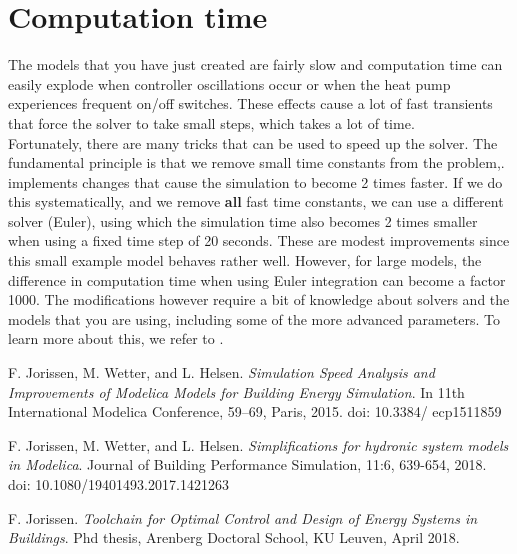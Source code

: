 \documentclass[10pt,a4paper]{article}
\begin{document}
\newpage

\section{Computation time}
The models that you have just created are fairly slow
and computation time can easily explode when controller
oscillations occur or when the heat pump experiences frequent on/off switches. 
These effects cause a lot
of fast transients that force the solver to take small steps, 
which takes a lot of time.\\

Fortunately, there are many tricks that can be used to speed up the solver. 
The fundamental principle is that we remove small time constants from the problem,.
 implements changes that
cause the simulation to become 2 times faster.
If we do this systematically, and we remove \textbf{all} fast time constants,
we can use a different solver (Euler), 
using which the simulation time also becomes 2 times smaller
when using a fixed time step of 20 seconds.
These are modest improvements since this small example model behaves rather well.
However, for large models, the difference in computation time 
when using Euler integration can become a factor 1000.
The modifications however require a bit of knowledge about solvers 
and the models that you are using, including some of the more advanced parameters.
To learn more about this, we refer to \cite{Jorissen2015,Jorissen2018,phd}.

\vfill

\begin{thebibliography}{9}
F. Jorissen, M. Wetter, and L. Helsen. \textit{Simulation Speed Analysis and Improvements of Modelica Models for Building Energy Simulation}. In 11th International Modelica Conference, 59–69, Paris, 2015. doi: 10.3384/ ecp1511859

F. Jorissen, M. Wetter, and L. Helsen. \textit{Simplifications for hydronic system models in Modelica}. Journal of Building Performance Simulation, 11:6, 639-654, 2018. doi: 10.1080/19401493.2017.1421263

F. Jorissen. \textit{Toolchain for Optimal Control and Design of Energy Systems in Buildings}. Phd thesis, Arenberg Doctoral School, KU Leuven, April 2018.

\end{thebibliography}
\end{document}
